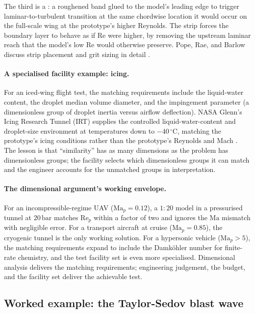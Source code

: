 The third is a : a roughened band glued
to the model's leading edge to trigger laminar-to-turbulent
transition at the same chordwise location it would occur on the
full-scale wing at the prototype's higher Reynolds. The strip
forces the boundary layer to behave as if $\mathrm{Re}$ were
higher, by removing the upstream laminar reach that the model's
low $\mathrm{Re}$ would otherwise preserve. Pope, Rae, and Barlow
discuss strip placement and grit sizing in detail
\cite{text:ch02t3-pope-experimental}.

\paragraph{A specialised facility example: icing.} For an iced-wing
flight test, the matching requirements include the liquid-water
content, the droplet median volume diameter, and the impingement
parameter (a dimensionless group of droplet inertia versus airflow
deflection). NASA Glenn's Icing Research Tunnel (IRT) supplies
the controlled liquid-water-content and droplet-size environment at
temperatures down to $-40 \,{}^{\circ}\mathrm{C}$, matching the
prototype's icing conditions rather than the prototype's Reynolds
and Mach
\cite{web:ch02t3-nasa-irt}. The lesson is that ``similarity'' has
as many dimensions as the problem has dimensionless groups; the
facility selects which dimensionless groups it can match and the
engineer accounts for the unmatched groups in interpretation.

\paragraph{The dimensional argument's working envelope.} For an
incompressible-regime UAV ($\mathrm{Ma}_{p} = 0.12$), a $1{:}20$
model in a pressurised tunnel at $20 \,\text{bar}$ matches
$\mathrm{Re}_{p}$ within a factor of two and ignores the
$\mathrm{Ma}$ mismatch with negligible error. For a transport
aircraft at cruise ($\mathrm{Ma}_{p} = 0.85$), the cryogenic
tunnel is the only working solution. For a hypersonic vehicle
($\mathrm{Ma}_{p} > 5$), the matching requirements expand to
include the Damk\"ohler number for finite-rate chemistry, and the
test facility set is even more specialised. Dimensional analysis
delivers the matching requirements; engineering judgement, the
budget, and the facility set deliver the achievable test.

\subsection{Worked example: the Taylor-Sedov blast wave}

